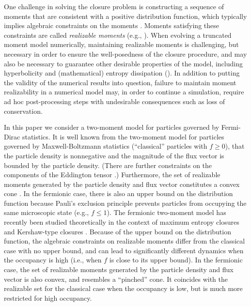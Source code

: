 One challenge in solving the closure problem is constructing a sequence of moments that are consistent with a positive distribution function, which typically implies algebraic constraints on the moments \cite{kershaw_1976,levermore_1984}.  
Moments satisfying these constraints are called \emph{realizable moments} (e.g., \cite{levermore_1996}).  
When evolving a truncated moment model numerically, maintaining realizable moments is challenging, but necessary in order to ensure the well-posedness of the closure procedure, and may also be necessary to guarantee other desirable properties of the model, including hyperbolicity and (mathematical) entropy dissipation ().  
In addition to putting the validity of the numerical results into question, failure to maintain moment realizability in a numerical model may, in order to continue a simulation, require ad hoc post-processing steps with undesirable consequences such as loss of conservation.  

In this paper we consider a two-moment model for particles governed by Fermi-Dirac statistics.  
It is well known from the two-moment model for particles governed by Maxwell-Boltzmann statistics (``classical'' particles with $f\ge0$), that the particle density is nonnegative and the magnitude of the flux vector is bounded by the particle density.  
(There are further constraints on the components of the Eddington tensor \cite{levermore_1984}.)  
Furthermore, the set of realizable moments generated by the particle density and flux vector constitutes a convex cone \cite{olbrant_etal_2012}.  
In the fermionic case, there is also an upper bound on the distribution function because Pauli's exclusion principle prevents particles from occupying the same microscopic state (e.g., $f\le1$).  
The fermionic two-moment model has recently been studied theoretically in the context of maximum entropy closures \cite{lareckiBanach_2011,banachLarecki_2013,banachLarecki_2017b} and Kershaw-type closures \cite{banachLarecki_2017a}.  
Because of the upper bound on the distribution function, the algebraic constraints on realizable moments differ from the classical case with no upper bound, and can lead to significantly different dynamics when the occupancy is high (i.e., when $f$ is close to its upper bound).  
In the fermionic case, the set of realizable moments generated by the particle density and flux vector is also convex, and resembles a ``pinched'' cone.  
It coincides with the realizable set for the classical case when the occupancy is low, but is much more restricted for high occupancy.  

